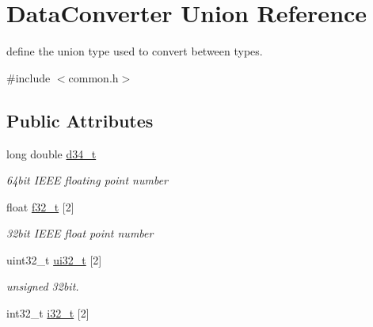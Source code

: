 \hypertarget{union_data_converter}{\section{Data\+Converter Union Reference}
\label{union_data_converter}
}


define the union type used to convert between types.  




{\ttfamily \#include $<$common.\+h$>$}

\subsection*{Public Attributes}
\begin{DoxyCompactItemize}
\item 
\hypertarget{union_data_converter_ae9dce194bf800c0ea89942da406dc525}{long double \hyperlink{union_data_converter_ae9dce194bf800c0ea89942da406dc525}{d34\+\_\+t}}\label{union_data_converter_ae9dce194bf800c0ea89942da406dc525}

\begin{DoxyCompactList}\small\item\em 64bit I\+E\+E\+E floating point number \end{DoxyCompactList}\item 
\hypertarget{union_data_converter_ac99b9f7c8af24916e3b7993c1928b4f2}{float \hyperlink{union_data_converter_ac99b9f7c8af24916e3b7993c1928b4f2}{f32\+\_\+t} \mbox{[}2\mbox{]}}\label{union_data_converter_ac99b9f7c8af24916e3b7993c1928b4f2}

\begin{DoxyCompactList}\small\item\em 32bit I\+E\+E\+E float point number \end{DoxyCompactList}\item 
\hypertarget{union_data_converter_a20845be2f89b1012e3942dca4c5fa117}{uint32\+\_\+t \hyperlink{union_data_converter_a20845be2f89b1012e3942dca4c5fa117}{ui32\+\_\+t} \mbox{[}2\mbox{]}}\label{union_data_converter_a20845be2f89b1012e3942dca4c5fa117}

\begin{DoxyCompactList}\small\item\em unsigned 32bit. \end{DoxyCompactList}\item 
\hypertarget{union_data_converter_a0cf5f8f2f3ba3f3e1a1c44a21248d910}{int32\+\_\+t \hyperlink{union_data_converter_a0cf5f8f2f3ba3f3e1a1c44a21248d910}{i32\+\_\+t} \mbox{[}2\mbox{]}}\label{union_data_converter_a0cf5f8f2f3ba3f3e1a1c44a21248d910}


\end{DoxyCompactItemize}
